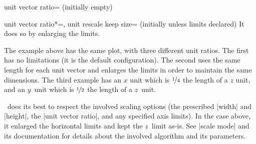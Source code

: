 \begin{pgfplotskey}{unit vector ratio= (initially empty)}
\begin{pgfplotskeylist}{%
		unit vector ratio*=,
		unit rescale keep size= (initially unless limits declared)}
	It does so by enlarging the limits.
\begin{codeexample}[]
\end{codeexample}
	\noindent The example above has the same plot, with three different unit ratios. The first has no limitations (it is the default configuration). The second uses the same length for each unit vector and enlarges the limits in order to maintain the same dimensions. The third example has an $x$ unit which is $\nicefrac14$ the length of a $z$ unit, and an $y$~unit which is $\nicefrac12$ the length of a $z$~unit.

	\PGFPlots\ does its best to respect the involved scaling options (the prescribed |width| and |height|, the |unit vector ratio|, and any specified axis limits). In the case above, it enlarged the horizontal limits and kept the $z$~limit as-is. See |scale mode| and its documentation for details about the involved algorithm and its parameters.


\end{pgfplotskeylist}
\end{pgfplotskey}
